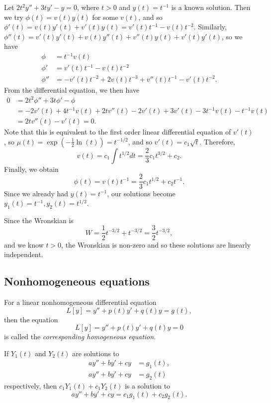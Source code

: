\begin{exmp}
    Let $2t^2y'' + 3ty' - y = 0$, where $t > 0$ and $y(t) = t^{-1}$ is a known solution. Then we try $\phi(t) = v(t)y(t)$ for some $v(t)$, and so $\phi'(t) = v(t)y'(t) + v'(t)y(t) = v'(t)t^{-1} - v(t)t^{-2}$. Similarly, $\phi''(t) = v'(t)y'(t) + v(t)y''(t) + v''(t)y(t) + v'(t)y'(t)$, so we have
    \begin{align*}
        \phi &= t^{-1}v(t) \\
        \phi' &= v'(t)t^{-1} - v(t)t^{-2} \\
        \phi'' &= -v'(t)t^{-2} + 2v(t)t^{-3} + v''(t)t^{-1} - v'(t)t^{-2}.
    \end{align*}
    From the differential equation, we then have
    \begin{align*}
        0 &= 2t^2\phi'' + 3t\phi' - \phi \\
        &= -2v'(t) + 4t^{-1}v(t) + 2tv''(t) - 2v'(t) + 3v'(t) - 3t^{-1}v(t) - t^{-1}v(t) \\
        &= 2tv''(t)-v'(t) = 0.
    \end{align*}
    Note that this is equivalent to the first order linear differential equation of $v'(t)$, so $\mu(t) = \exp\left(-\frac{1}{2}\ln(t)\right) = t^{-1/2}$, and so $v'(t) = c_1\sqrt{t}$. Therefore,
    \[v(t) = c_1\int t^{1/2}dt = \frac{2}{3}c_1t^{3/2} + c_2.\] Finally, we obtain
    \[\phi(t) = v(t)t^{-1} = \frac{2}{3}c_1t^{1/2} + c_2t^{-1}.\] Since we already had $y(t) = t^{-1}$, our solutions become $y_1(t) = t^{-1}, y_2(t) = t^{1/2}$.

    Since the Wronskian is
    \[W = \frac{1}{2}t^{-3/2} + t^{-3/2} = \frac{3}{2}t^{-3/2},\] and we know $t > 0$, the Wronskian is non-zero and so these solutions are linearly independent.
\end{exmp}

\subsection{Nonhomogeneous equations}

\begin{defn}
    For a linear nonhomogeneous differential equation
    \[L[y] = y'' + p(t)y' + q(t)y = g(t),\] then the equation
    \[L[y] = y'' + p(t)y' + q(t)y = 0\] is called the \emph{corresponding homogeneous equation}.
\end{defn}

\begin{thm}\label{linear-nonhomogeneous-sum}
    If $Y_1(t)$ and $Y_2(t)$ are solutions to
    \begin{align*}
        ay'' + by' + cy &= g_1(t), \\
        ay'' + by' + cy &= g_2(t)
    \end{align*} respectively, then $c_1Y_1(t) + c_1Y_2(t)$ is a solution to
    \[ay'' + by' + cy = c_1g_1(t) + c_2g_2(t).\]
\end{thm}

